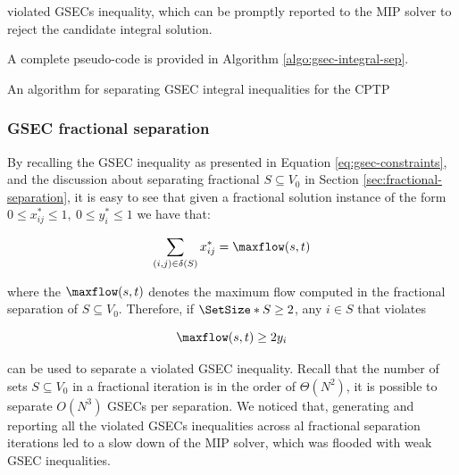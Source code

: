violated GSECs inequality, which can be promptly reported to the MIP solver to reject the candidate integral solution.

A complete pseudo-code is provided in Algorithm \ref{algo:gsec-integral-sep}.

\begin{algorithm}
	\caption{An algorithm for separating GSEC integral inequalities for the CPTP}
	\label{algo:gsec-integral-sep}
	
\end{algorithm}

\subsubsection{GSEC fractional separation}
\label{sec:impl-gsec-fractional-separation}

By recalling the GSEC inequality as presented in Equation \eqref{eq:gsec-constraints}, and the discussion about separating fractional $S \subseteq V_0$ in Section \ref{sec:fractional-separation}, it is easy to see that given a fractional solution instance of the form $0 \le x^*_{ij} \le 1,\ 0 \le y^*_{i} \le 1$ we have that:

\begin{equation}
	\sum_{(i, j) \in \delta(S)} x^*_{ij} = \maxflow(s, t)
\end{equation}

where the $\maxflow(s, t)$ denotes the maximum flow computed in the fractional separation of $S \subseteq V_0$.
Therefore, if $\SetSize*{S} \ge 2$, any $i \in S$ that violates

\begin{equation}
	\maxflow(s, t) \ge 2 y_i
\end{equation}

can be used to separate a violated GSEC inequality.
Recall that the number of sets $S \subseteq V_0$ in a fractional iteration is in the order of $\Theta(N^2)$, it is possible to separate $O(N^3)$ GSECs per separation.
We noticed that, generating and reporting all the violated GSECs inequalities across al fractional separation iterations led to a slow down of the MIP solver, which was flooded with weak GSEC inequalities.

